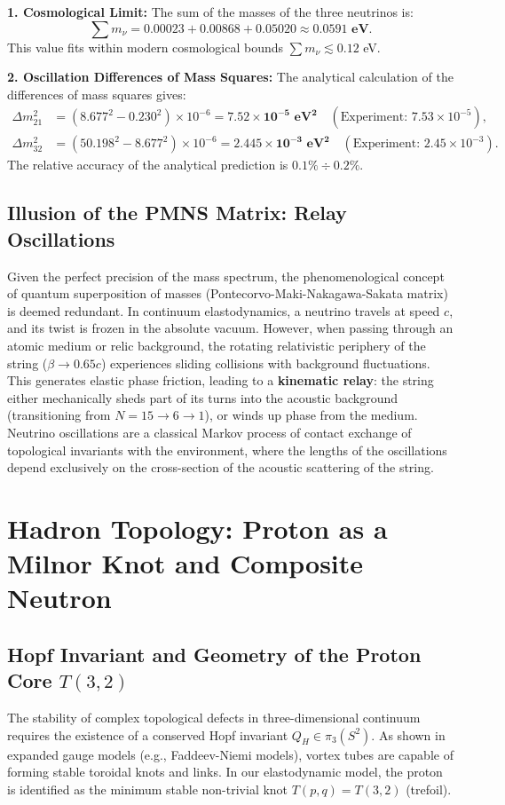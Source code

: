 \documentclass[11pt,a4paper]{article}
\begin{document}
\textbf{1. Cosmological Limit:}
The sum of the masses of the three neutrinos is:
\begin{equation}
	\sum m_\nu = 0.00023 + 0.00868 + 0.05020 \approx \mathbf{0.0591 \text{ eV}}.
\end{equation}
This value fits within modern cosmological bounds $\sum m_\nu \lesssim 0.12$ eV.

\textbf{2. Oscillation Differences of Mass Squares:}
The analytical calculation of the differences of mass squares gives:
\begin{align}
	\Delta m^2_{21} &= (8.677^2 - 0.230^2) \times 10^{-6} = \mathbf{7.52 \times 10^{-5} \text{ eV}^2} \quad (\text{Experiment: } 7.53 \times 10^{-5}), \\
	\Delta m^2_{32} &= (50.198^2 - 8.677^2) \times 10^{-6} = \mathbf{2.445 \times 10^{-3} \text{ eV}^2} \quad (\text{Experiment: } 2.45 \times 10^{-3}).
\end{align}
The relative accuracy of the analytical prediction is $0.1\% \div 0.2\%$.

\subsection{Illusion of the PMNS Matrix: Relay Oscillations}
Given the perfect precision of the mass spectrum, the phenomenological concept of quantum superposition of masses (Pontecorvo-Maki-Nakagawa-Sakata matrix) is deemed redundant. In continuum elastodynamics, a neutrino travels at speed $c$, and its twist is frozen in the absolute vacuum.
However, when passing through an atomic medium or relic background, the rotating relativistic periphery of the string ($\beta \to 0.65c$) experiences sliding collisions with background fluctuations. This generates elastic phase friction, leading to a \textbf{kinematic relay}: the string either mechanically sheds part of its turns into the acoustic background (transitioning from $N=15 \to 6 \to 1$), or winds up phase from the medium.
Neutrino oscillations are a classical Markov process of contact exchange of topological invariants with the environment, where the lengths of the oscillations depend exclusively on the cross-section of the acoustic scattering of the string.

\section{Hadron Topology: Proton as a Milnor Knot and Composite Neutron}

\subsection{Hopf Invariant and Geometry of the Proton Core $T(3,2)$}
The stability of complex topological defects in three-dimensional continuum requires the existence of a conserved Hopf invariant $Q_H \in \pi_3(S^2)$. As shown in expanded gauge models (e.g., Faddeev-Niemi models), vortex tubes are capable of forming stable toroidal knots and links.
In our elastodynamic model, the proton is identified as the minimum stable non-trivial knot $T(p,q) = T(3,2)$ (trefoil).
\end{document}
